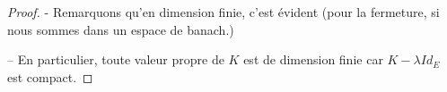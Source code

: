 \begin{proof}
	- Remarquons qu'en dimension finie, c'est évident (pour la fermeture, si
	nous sommes dans un espace de banach.)

	-- En particulier, toute valeur propre de $K$ est de dimension finie car $K
	- \lambda Id_{E}$ est compact.







\end{proof}





